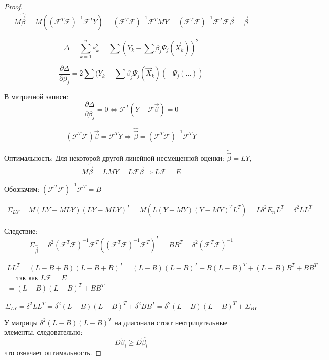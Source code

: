 \begin{proof}
  \begin{multline*}
    M \hat{\vec{\beta}} = M ( (\mathcal{F}^T \mathcal{F})^{-1} \mathcal{F}^T Y )
    = (\mathcal{F}^T \mathcal{F})^{-1} \mathcal{F}^T MY 
    =(\mathcal{F}^T \mathcal{F})^{-1} \mathcal{F}^T \mathcal{F} \vec{\beta}
    = \vec{\beta}
  \end{multline*}

  \[ 
    \Delta = \sum_{k=1}^n \varepsilon_k^2
    = \sum (Y_k - \sum \beta_j \Psi_j (\vec{X}_k) )^2
  \] 

  \[
    \dfrac{\partial \Delta}{\partial \beta_j} = 2 \sum (Y_k - \sum \beta_j \Psi_j(\vec{X}_k) (-\Psi_j (\dots)) 
  \]

  В матричной записи:
  \[
    \dfrac{\partial \Delta}{\partial \beta_j} = 0
    \Leftrightarrow \mathcal{F}^T (Y - \mathcal{F} \vec{\beta}) = 0
  \]

  \[
    (\mathcal{F}^T \mathcal{F}) \vec{\beta} = \mathcal{F}^T Y
    \Rightarrow
    \hat{\vec{\beta}} = (\mathcal{F}^T \mathcal{F})^{-1} \mathcal{F}^T Y
  \]

  Оптимальность:
  Для некоторой другой линейной несмещенной оценки:
  $\tilde{\vec{\beta}} = L Y$,
  \[
    M \tilde{\vec{\beta}} = L MY = L \mathcal{F} \vec{\beta}
    \Rightarrow L \mathcal{F} = E
  \]

  Обозначим: $(\mathcal{F}^T \mathcal{F})^{-1} \mathcal{F}^T = B$

  \begin{multline*}
    \Sigma_{LY} = M(LY - MLY)(LY - MLY)^T = M( L(Y-MY)(Y-MY)^T L^T ) = L \delta^2 E_n L^T = \delta^2 L L^T
  \end{multline*}

  Следствие: 
  \[
    \Sigma_{\hat{\vec{\beta}}} = \delta^2 (\mathcal{F}^T \mathcal{F})^{-1} \mathcal{F}^T ( (\mathcal{F}^T \mathcal{F})^{-1} \mathcal{F}^T )^T = B B^T = \delta^2 (\mathcal{F}^T \mathcal{F})^{-1} 
  \]

  \begin{multline*}
    LL^T = (L-B+B) (L-B+B)^T = (L-B)(L-B)^T + B (L-B)^T + (L-B) B^T + BB^T = \\
    = \text{так как $L\mathcal{F} = E$} = \\
    = (L-B)(L-B)^T + BB^T
  \end{multline*}

  \[
    \Sigma_{LY} = \delta^2 LL^T = \delta^2 (L-B)(L-B)^T + \delta^2 BB^T = \delta^2 (L-B)(L-B)^T + \Sigma_{BY}
  \]

  У матрицы $\delta^2 (L-B)(L-B)^T$ на диагонали стоят неотрицательные элементы, следовательно:
  \[
    D\tilde{\beta_i} \geqslant D\hat{\beta_i}
  \]
  что означает оптимальность.
\end{proof}

